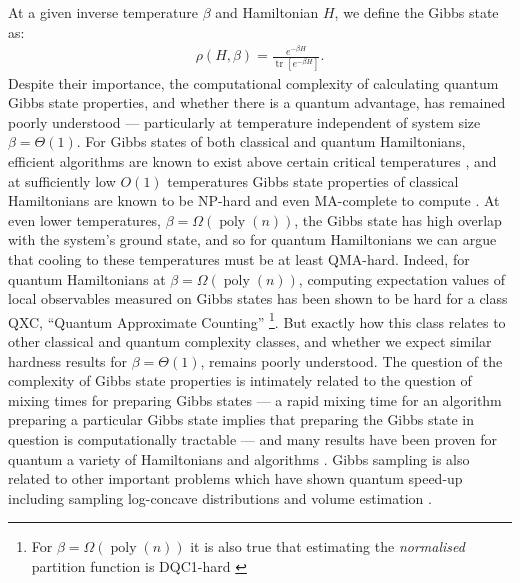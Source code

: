 \documentclass[a4paper,onecolumn,11pt,accepted=2017-05-09]{quantumarticle}
\DeclareMathOperator{\poly}{poly}
\DeclareMathOperator{\tr}{tr}
\begin{document}
    At a given inverse temperature $\beta$ and Hamiltonian $H$, we define the Gibbs state as:
    \begin{align*}
        \rho(H, \beta) = \frac{e^{-\beta H}}{\tr\left[e^{-\beta H}\right]}.
    \end{align*}
    Despite their importance, the computational complexity of calculating quantum Gibbs state properties, and whether there is a quantum advantage, has remained poorly understood --- particularly at temperature independent of system size $\beta = \Theta(1)$. 
    For Gibbs states of both classical and quantum Hamiltonians, efficient algorithms are known to exist above certain critical temperatures  \cite{francca2017perfect,harrow2020classical, mann2021efficient,yin2023polynomial, rouze2024efficient, bakshi2024high}, and at sufficiently low $O(1)$ temperatures Gibbs state properties of classical Hamiltonians are known to be \textsf{NP}-hard  and even \textsf{MA}-complete to compute \cite{sly2010computational,crosson2010making, sly2012computational}.
    At even lower temperatures, $\beta = \Omega(\poly(n))$, the Gibbs state has high overlap with the system's ground state, and so for quantum Hamiltonians we can argue that cooling to these temperatures must be at least \textsf{QMA}-hard.
    Indeed, for quantum Hamiltonians at $\beta = \Omega(\poly(n))$, computing expectation values of local observables measured on Gibbs states has been shown to be hard for a class \textsf{QXC}, ``Quantum Approximate Counting'' \cite{bravyi2022quantum, bravyi2024quantum}\footnote{For $\beta=\Omega(\poly(n))$ it is also true that estimating the \textit{normalised} partition function is DQC1-hard \cite{brandao2008entanglement}}.
    But exactly how this class relates to other classical and quantum complexity classes, and whether we expect similar hardness results for $\beta=\Theta(1)$, remains poorly understood.
    The question of the complexity of Gibbs state properties is intimately related to the question of mixing times for preparing Gibbs states --- a rapid mixing time for an algorithm preparing a particular Gibbs state implies that preparing the Gibbs state in question is computationally tractable --- and many results have been proven for quantum a variety of Hamiltonians and algorithms \cite{gamarnik2024slow, basso2024optimizing, chen2024local, smid2025rapid, bergamaschi2025quantum}. 
    Gibbs sampling is also related to other important problems which have shown quantum speed-up including sampling log-concave distributions and volume estimation \cite{childs2022quantum, chakrabarti2023quantum}. 
\end{document}
